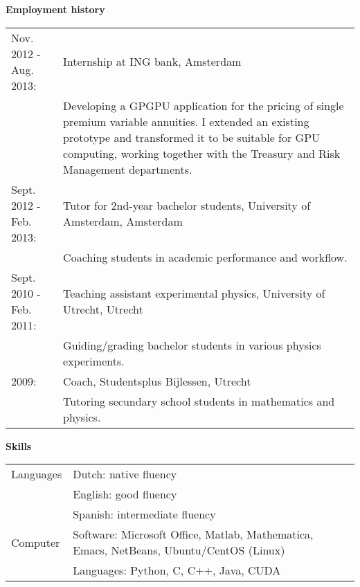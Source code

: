 \documentclass[11pt,a4paper,onecolumn]{article}
\begin{document}
{\Large \textbf{Employment history} }
\begin{table}[H]
  \begin{tabular}{p{} p{}}
    Nov. 2012 - Aug. 2013: & Internship at ING bank, Amsterdam \\
    & {\small Developing a GPGPU application for the pricing of single premium variable annuities. I extended an existing prototype and transformed it to be suitable for GPU computing, working together with the Treasury and Risk Management departments. } \\
    Sept. 2012 - Feb. 2013: & Tutor for 2nd-year bachelor students, University of Amsterdam, Amsterdam \\
    & {\small Coaching students in academic performance and workflow.} \\
    Sept. 2010 - Feb. 2011: & Teaching assistant experimental physics, University of Utrecht, Utrecht \\
    & {\small Guiding/grading bachelor students in various physics experiments. } \\
    2009: & Coach, Studentsplus Bijlessen, Utrecht \\
    & {\small Tutoring secundary school students in mathematics and physics. }
  \end{tabular}
\end{table}


{\Large \textbf{Skills} }
\begin{table}[H]
  \begin{tabular}{p{} p{}}

    Languages & Dutch: native fluency \\
    & English: good fluency \\
    & Spanish: intermediate fluency \\

    Computer & Software: Microsoft Office, Matlab, Mathematica, Emacs, NetBeans, Ubuntu/CentOS (Linux) \\
    & Languages: Python, C, C++, Java, CUDA \\

  \end{tabular}
\end{table}
\end{document}
